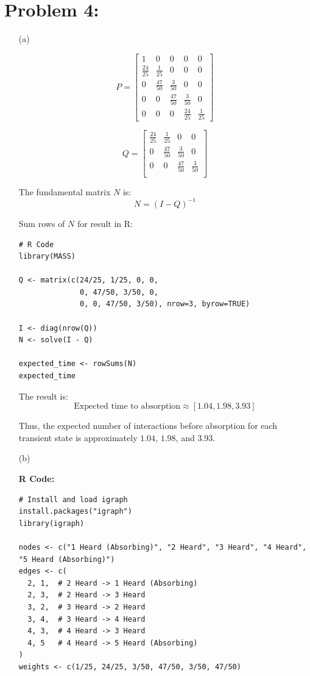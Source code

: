 \documentclass{article}
\begin{document}
\section*{Problem 4:}
\begin{enumerate}

\item[(a)]

\[
P = 
\begin{bmatrix}
1 & 0 & 0 & 0 & 0 \\
\frac{24}{25} & \frac{1}{25} & 0 & 0 & 0 \\
0 & \frac{47}{50} & \frac{3}{50} & 0 & 0 \\
0 & 0 & \frac{47}{50} & \frac{3}{50} & 0 \\
0 & 0 & 0 & \frac{24}{25} & \frac{1}{25}
\end{bmatrix}
\]

\[
Q = 
\begin{bmatrix}
\frac{24}{25} & \frac{1}{25} & 0 & 0 \\
0 & \frac{47}{50} & \frac{3}{50} & 0 \\
0 & 0 & \frac{47}{50} & \frac{3}{50} \\
\end{bmatrix}
\]

The fundamental matrix $N$ is:
\[
N = (I - Q)^{-1}
\]

Sum rows of $N$ for result in R:

\begin{verbatim}
# R Code
library(MASS)

Q <- matrix(c(24/25, 1/25, 0, 0,
              0, 47/50, 3/50, 0,
              0, 0, 47/50, 3/50), nrow=3, byrow=TRUE)

I <- diag(nrow(Q)) 
N <- solve(I - Q) 

expected_time <- rowSums(N)
expected_time
\end{verbatim}

The result is:
\[
\text{Expected time to absorption} \approx [1.04, 1.98, 3.93]
\]

Thus, the expected number of interactions before absorption for each transient state is approximately \(1.04\), \(1.98\), and \(3.93\).

\item[(b)]

\textbf{R Code:}

\begin{verbatim}
# Install and load igraph
install.packages("igraph")
library(igraph)

nodes <- c("1 Heard (Absorbing)", "2 Heard", "3 Heard", "4 Heard", "5 Heard (Absorbing)")
edges <- c(
  2, 1,  # 2 Heard -> 1 Heard (Absorbing)
  2, 3,  # 2 Heard -> 3 Heard
  3, 2,  # 3 Heard -> 2 Heard
  3, 4,  # 3 Heard -> 4 Heard
  4, 3,  # 4 Heard -> 3 Heard
  4, 5   # 4 Heard -> 5 Heard (Absorbing)
)
weights <- c(1/25, 24/25, 3/50, 47/50, 3/50, 47/50)


\end{verbatim}
\end{enumerate}
\end{document}
